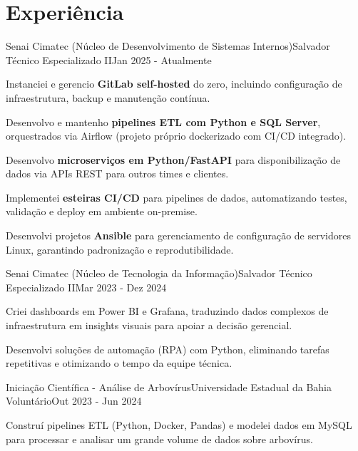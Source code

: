 \section{\textbf{Experiência}}
\resumeSubHeadingListStart
\resumeSubheading
{Senai Cimatec (Núcleo de Desenvolvimento de Sistemas Internos)}{Salvador}
{Técnico Especializado II}{Jan 2025 - Atualmente}
\vspace{-2.0mm}
\resumeItemListStart
\item {Instanciei e gerencio \textbf{GitLab self-hosted} do zero, incluindo configuração de infraestrutura, backup e manutenção contínua.}
\item {Desenvolvo e mantenho \textbf{pipelines ETL com Python e SQL Server}, orquestrados via Airflow (projeto próprio dockerizado com CI/CD integrado).}
\item {Desenvolvo \textbf{microserviços em Python/FastAPI} para disponibilização de dados via APIs REST para outros times e clientes.}
\item {Implementei \textbf{esteiras CI/CD} para pipelines de dados, automatizando testes, validação e deploy em ambiente on-premise.}
\item {Desenvolvi projetos \textbf{Ansible} para gerenciamento de configuração de servidores Linux, garantindo padronização e reprodutibilidade.}
\resumeItemListEnd

\resumeSubheading
{Senai Cimatec (Núcleo de Tecnologia da Informação)}{Salvador}
{Técnico Especializado II}{Mar 2023 - Dez 2024}
\vspace{-2.0mm}
\resumeItemListStart
\item {Criei dashboards em Power BI e Grafana, traduzindo dados complexos de infraestrutura em insights visuais para apoiar a decisão gerencial.}
\item {Desenvolvi soluções de automação (RPA) com Python, eliminando tarefas repetitivas e otimizando o tempo da equipe técnica.}
\resumeItemListEnd

\resumeSubheading
{Iniciação Científica - Análise de Arbovírus}{Universidade Estadual da Bahia}
{Voluntário}{Out 2023 - Jun 2024}
\vspace{-2.0mm}
\resumeItemListStart
\item {Construí pipelines ETL (Python, Docker, Pandas) e modelei dados em MySQL para processar e analisar um grande volume de dados sobre arbovírus.}
\resumeItemListEnd

\resumeSubHeadingListEnd
\vspace{-8.5mm}

